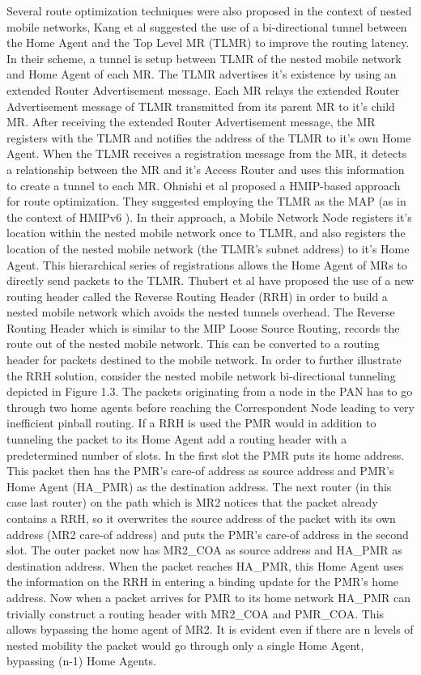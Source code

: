Several route optimization techniques were also proposed in the context of
nested mobile networks, Kang et al \cite{28} suggested the use of a bi-directional
tunnel between the Home Agent and the Top Level MR (TLMR) to improve the routing latency. In their scheme, a tunnel is setup between TLMR of the nested mobile network and Home Agent of each MR. The TLMR advertises it's existence by using an extended Router Advertisement
message. Each MR relays the extended Router Advertisement message of TLMR
transmitted from its parent MR to it's child MR. After
receiving the extended Router Advertisement message, the MR
registers with the TLMR and notifies the address of the TLMR to it's own Home Agent. When
the  TLMR receives a registration message from the MR, it detects a
relationship between the MR and it's Access Router and uses this
information to create a tunnel to each MR. Ohnishi et al \cite{29}
proposed a HMIP-based approach for route optimization. They suggested employing
the TLMR as the MAP (as in the context of HMIPv6 \cite{30}). In
their approach, a Mobile Network Node registers it's location within the nested
mobile network once to TLMR, and also registers the location of the nested
mobile network (the TLMR's subnet address) to it's Home Agent. This
hierarchical series of registrations allows the Home Agent of MRs to directly
send packets to the TLMR.
Thubert et al \cite{31} have proposed the use of a new routing header called the Reverse
Routing Header (RRH) in order to build a nested mobile network which avoids
the nested tunnels overhead. The Reverse Routing Header which is similar to
the MIP Loose Source Routing, records the route out of the nested mobile
network. This can be converted to a routing header for packets destined to the
mobile network. In order to further illustrate the RRH solution, consider the
nested mobile network bi-directional tunneling depicted in Figure 1.3. The
packets originating from a node in the PAN has to go through two home agents
before reaching the Correspondent Node leading to very inefficient pinball
routing. If a RRH is used the PMR would in addition to tunneling the packet to
its Home Agent add a routing header with a predetermined number of slots. In
the first slot the PMR puts its home address. This packet then has the PMR's
care-of address as source address and PMR's Home Agent (HA\_PMR) as the
destination address. The next router (in this case last router) on the path
which is MR2 notices that the packet already contains a RRH, so it overwrites
the source address of the packet with its own address (MR2 care-of address)
and puts the PMR's care-of address in the second slot. The outer packet now
has MR2\_COA as source address and HA\_PMR as destination address. When the
packet reaches HA\_PMR, this Home Agent uses the information on the RRH in
entering a binding update for the PMR's home address. Now when a packet
arrives for PMR to its home network HA\_PMR can trivially construct a routing
header with MR2\_COA and PMR\_COA. This allows bypassing the home agent of
MR2. It is evident even if there are n levels of nested mobility the packet
would go through only a single Home Agent, bypassing (n-1) Home Agents.



